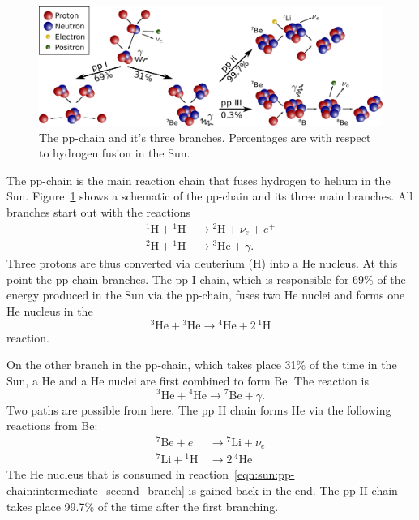 \begin{figure}[tb]
    \centering
    \includegraphics[width=\textwidth]{graphics/sun/pp_chain}
    \caption{The \ac{pp-chain} and it's three branches. Percentages are with respect to hydrogen fusion in the Sun.}
    \label{fig:sun:pp-chain}
\end{figure}
The \ac{pp-chain} is the main reaction chain that fuses hydrogen to helium in the Sun. Figure~\ref{fig:sun:pp-chain} shows a schematic of the \ac{pp-chain} and its three main branches. All branches start out with the reactions
\begin{align}
    {^1}\mathrm{H} + {^1}\mathrm{H} &\longrightarrow {^2}\mathrm{H} + \nu_e + e^+ \\
    {^2}\mathrm{H} + {^1}\mathrm{H} &\longrightarrow {^3}\mathrm{He} + \gamma.
\end{align}
Three protons are thus converted via deuterium (H) into a He nucleus. At this point the \ac{pp-chain} branches. The pp I chain, which is responsible for 69\% of the energy produced in the Sun via the \ac{pp-chain}, fuses two He nuclei and forms one He nucleus in the
\begin{equation}
    {^3}\mathrm{He} + {^3}\mathrm{He} \longrightarrow {^4}\mathrm{He} + 2\,{^1}\mathrm{H}
\end{equation}
reaction.

On the other branch in the \ac{pp-chain}, which takes place 31\% of the time in the Sun, a He and a He nuclei are first combined to form Be. The reaction is
\begin{equation}
    {^3}\mathrm{He} + {^4}\mathrm{He} \longrightarrow {^7}\mathrm{Be} + \gamma. \label{eqn:sun:pp-chain:intermediate_second_branch}
\end{equation}
Two paths are possible from here. The pp II chain forms He via the following reactions from Be:
\begin{align}
    {^7}\mathrm{Be} + e^{-} &\longrightarrow {^7}\mathrm{Li} + \nu_e \\
    {^7}\mathrm{Li} + {^1}\mathrm{H} &\longrightarrow 2\,{^4}\mathrm{He}
\end{align}
The He nucleus that is consumed in reaction~\eqref{eqn:sun:pp-chain:intermediate_second_branch} is gained back in the end. The pp II chain takes place 99.7\% of the time after the first branching.

